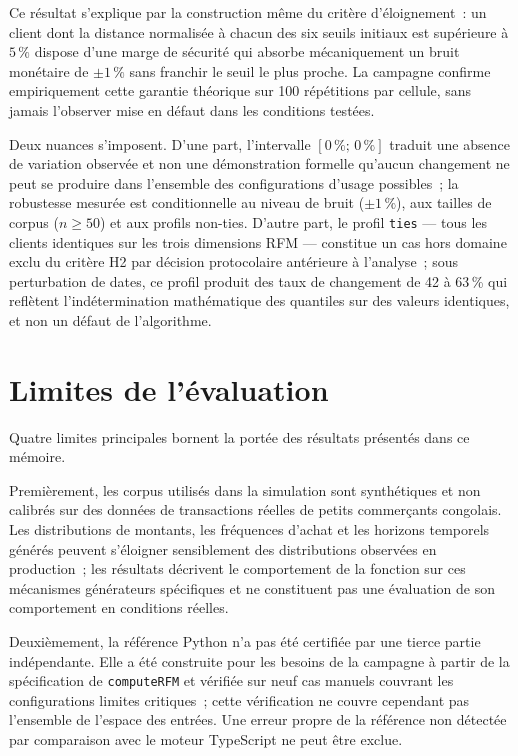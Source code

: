 Ce résultat s'explique par la construction même du critère d'éloignement~: un client dont
la distance normalisée à chacun des six seuils initiaux est supérieure à $5\,\%$ dispose
d'une marge de sécurité qui absorbe mécaniquement un bruit monétaire de $\pm1\,\%$ sans
franchir le seuil le plus proche. La campagne confirme empiriquement cette garantie
théorique sur 100 répétitions par cellule, sans jamais l'observer mise en défaut dans les
conditions testées.

Deux nuances s'imposent. D'une part, l'intervalle $[0\,\% ;\, 0\,\%]$ traduit une absence
de variation observée et non une démonstration formelle qu'aucun changement ne peut se
produire dans l'ensemble des configurations d'usage possibles~; la robustesse mesurée est
conditionnelle au niveau de bruit ($\pm1\,\%$), aux tailles de corpus ($n \geq 50$) et aux
profils non-ties. D'autre part, le profil \texttt{ties} — tous les clients identiques sur
les trois dimensions RFM — constitue un cas hors domaine exclu du critère H2 par décision
protocolaire antérieure à l'analyse~; sous perturbation de dates, ce profil produit des
taux de changement de 42 à 63\,\% qui reflètent l'indétermination mathématique des
quantiles sur des valeurs identiques, et non un défaut de l'algorithme.

\section*{Limites de l'évaluation}

Quatre limites principales bornent la portée des résultats présentés dans ce mémoire.

Premièrement, les corpus utilisés dans la simulation sont synthétiques et non calibrés sur
des données de transactions réelles de petits commerçants congolais. Les distributions de
montants, les fréquences d'achat et les horizons temporels générés peuvent s'éloigner
sensiblement des distributions observées en production~; les résultats décrivent le
comportement de la fonction sur ces mécanismes générateurs spécifiques et ne constituent
pas une évaluation de son comportement en conditions réelles.

Deuxièmement, la référence Python n'a pas été certifiée par une tierce partie indépendante.
Elle a été construite pour les besoins de la campagne à partir de la spécification de
\texttt{computeRFM} et vérifiée sur neuf cas manuels couvrant les configurations limites
critiques~; cette vérification ne couvre cependant pas l'ensemble de l'espace des entrées.
Une erreur propre de la référence non détectée par comparaison avec le moteur TypeScript
ne peut être exclue.

